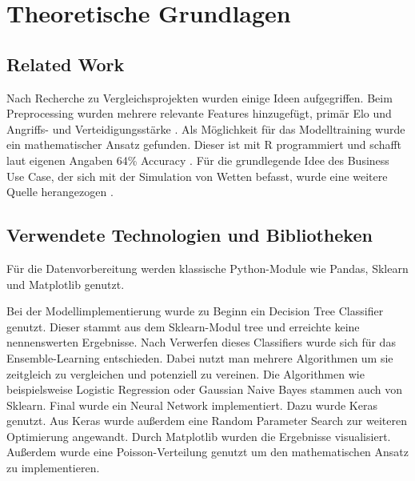 \chapter{Theoretische Grundlagen}

\section{Related Work}
Nach Recherche zu Vergleichsprojekten wurden einige Ideen aufgegriffen. Beim Preprocessing wurden mehrere relevante Features hinzugefügt, primär Elo und Angriffs- und Verteidigungsstärke \autocite[Vgl.][]{Accso.14102021}. Als Möglichkeit für das Modelltraining wurde ein mathematischer Ansatz gefunden. Dieser ist mit R programmiert und schafft laut eigenen Angaben 64\% Accuracy \autocite[Vgl.][]{Doan.15.3.2019}. Für die grundlegende Idee des Business Use Case, der sich mit der Simulation von Wetten befasst, wurde eine weitere Quelle herangezogen \autocite[Vgl.][]{Hartley.05102022}.

\section{Verwendete Technologien und Bibliotheken}
Für die Datenvorbereitung werden klassische Python-Module wie Pandas, Sklearn und Matplotlib genutzt.

Bei der Modellimplementierung wurde zu Beginn ein Decision Tree Classifier genutzt. Dieser stammt aus dem Sklearn-Modul tree und erreichte keine nennenswerten Ergebnisse. Nach Verwerfen dieses Classifiers wurde sich für das Ensemble-Learning entschieden. Dabei nutzt man mehrere Algorithmen um sie zeitgleich zu vergleichen und potenziell zu vereinen. Die Algorithmen wie beispielsweise Logistic Regression oder Gaussian Naive Bayes stammen auch von Sklearn. Final wurde ein Neural Network implementiert. Dazu wurde Keras genutzt. Aus Keras wurde außerdem eine Random Parameter Search zur weiteren Optimierung angewandt. Durch Matplotlib wurden die Ergebnisse visualisiert. Außerdem wurde eine Poisson-Verteilung genutzt um den mathematischen Ansatz zu implementieren.